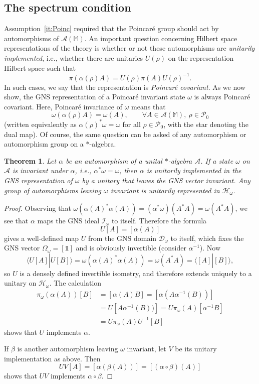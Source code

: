 \documentclass[12pt,a4paper]{article}
\newcommand{\1}{\mathds{1}}                         %
\newcommand{\MM}{\mathbb{M}}
\newcommand{\HH}{{\mathcal{H}}}
\newcommand{\DD}{{\mathscr{D}}}
\newcommand{\II}{{\mathbb{1}}}
\newcommand{\Ac}{{\mathcal{A}}}
\newcommand{\Ic}{{\mathcal{I}}}
\newcommand{\Pc}{{\mathcal{P}}}
\newcommand{\ip}[2]{\langle #1|#2\rangle}
\newtheorem{theorem}{Theorem}%
\begin{document}
\subsection{The spectrum condition}
Assumption~\ref{it:Poinc} required that
the Poincar\'e group should act by automorphisms of $\Ac(\MM)$. An important question concerning Hilbert space representations of the theory is whether or not these automorphisms are \emph{unitarily implemented}, i.e., whether there are unitaries $U(\rho)$ on the representation Hilbert space such that
\[
\pi(\alpha(\rho)A) = U(\rho) \pi(A) U(\rho)^{-1}.
\]
In such cases, we say that the representation is \emph{Poincar\'e covariant}.
As we now show, the GNS representation of a Poincar\'e invariant state $\omega$ is always Poincar\'e covariant. Here, Poincar\'e invariance of $\omega$ means that 
\[
\omega(\alpha(\rho)A) = \omega(A), \qquad\forall A\in\Ac(\MM),~\rho\in\Pc_0
\] 
(written equivalently as $\alpha(\rho)^*\omega=\omega$ for all $\rho\in\Pc_0$, with the star denoting the dual map). Of course, the same question can be asked of any automorphism or automorphism group on a $*$-algebra.
\begin{theorem}
	Let $\alpha$ be an automorphism of a unital $*$-algebra $\Ac$. If a state $\omega$ on $\Ac$ is invariant under $\alpha$, i.e., $\alpha^*\omega=\omega$, then $\alpha$ is unitarily implemented in the GNS representation of $\omega$ by a unitary that leaves the GNS vector invariant. Any group of automorphisms leaving $\omega$ invariant is unitarily represented in $\HH_\omega$. 
\end{theorem}
\begin{proof}
	Observing that $\omega(\alpha(A)^*\alpha(A))=(\alpha^*\omega)(A^*A)=\omega(A^*A)$, we see that $\alpha$ maps the GNS ideal $\Ic_\omega$ to itself. Therefore the formula
	\[
	U[A] = [\alpha(A)]
	\]
	gives a well-defined map $U$ from the GNS domain $\DD_\omega$ to itself, which fixes the GNS vector $\Omega_\omega=[\II]$ and is obviously invertible (consider $\alpha^{-1}$). Now
	\[
	\ip{U[A]}{U[B]} = \omega(\alpha(A)^*\alpha(A)) = \omega(A^*A) = \ip{[A]}{[B]},
	\]	
	so $U$ is a densely defined invertible isometry, and therefore extends uniquely to a unitary on $\HH_\omega$. The calculation
	\begin{align*}
	\pi_\omega(\alpha(A))[B] &= [\alpha(A)B] = [\alpha(A\alpha^{-1}(B))]\\
	& = U[A\alpha^{-1}(B))] = U\pi_\omega(A)[\alpha^{-1}B]\\
	& = U\pi_\omega(A)U^{-1}[B]
	\end{align*}
	shows that $U$ implements $\alpha$. 
	
	If $\beta$ is another automorphism leaving $\omega$ invariant, let $V$ be its unitary implementation as above. Then 
	\[
	UV[A]= [\alpha(\beta(A))] = [(\alpha\circ\beta)(A)]
	\]
	shows that $UV$ implements $\alpha\circ\beta$. 
\end{proof}
\end{document}
